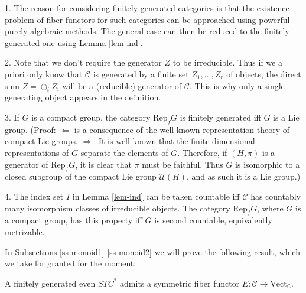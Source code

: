 \documentclass[12pt]{article}
\theoremstyle{definition}
\theoremstyle{definition}
\theoremstyle{remark}
\newcommand{\Vect}{\mathrm{Vect}}
\def\2#1{{\mathcal #1}}
\def\7#1{{\mathbb #1}}
\newcommand{\Rep}{\mathrm{Rep}}
\newcommand{\rarr}{\rightarrow}
\begin{document}
\brem \label{rem-fingen} 1. The reason for considering finitely
generated categories is that the existence problem of fiber functors
for such categories can be approached using powerful purely algebraic
methods. The general case can then be reduced to the finitely
generated one using Lemma \ref{lem-ind}.

2. Note that we don't require the generator $Z$ to be irreducible. Thus if
we a priori only know that $\2C$ is generated by a finite set $Z_1,\ldots,Z_r$ of objects, the
direct sum  $Z=\oplus_i Z_i$ will be a (reducible) generator of $\2C$. This is why only a single
generating object appears in the definition.

3. If $G$ is a compact group, the category $\Rep_fG$ is finitely generated iff $G$ is a Lie group.
(Proof: $\Leftarrow$ is a consequence of the well known representation theory of compact Lie
groups. $\Rightarrow$: It is well known that the finite dimensional representations of $G$
separate the elements of $G$.  Therefore, if $(H,\pi)$ is a generator of $\Rep_fG$, it is clear that
$\pi$ must be faithful. Thus $G$ is isomorphic to a closed subgroup of the compact Lie group
$\2U(H)$, and as such it is a Lie group.)

4. The index set $I$ in Lemma \ref{lem-ind} can be taken countable iff
$\2C$ has countably many isomorphism classes of irreducible objects.
The category $\Rep_fG$, where $G$ is a compact group, has this
property iff $G$ is second countable, equivalently metrizable.  \erem

In Subsections \ref{ss-monoid1}-\ref{ss-monoid2} we will prove the following result, which we take
for granted for the moment:

\btheor \label{theor-D} 
A finitely generated even $STC^*$ admits a symmetric  fiber functor $E: \2C\rarr\Vect_\7C$.  
\etheor
\end{document}

